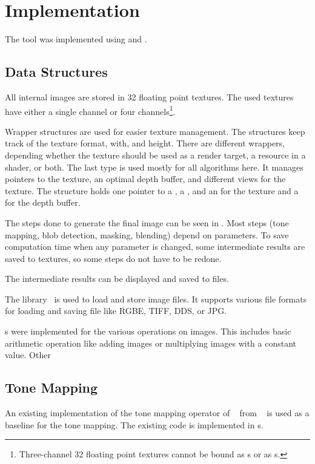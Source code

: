 \section{Implementation}
The tool was implemented using \Cpp{} and \DirectX{}.

\subsection{Data Structures} %
All internal images are stored in \SI{32}{\bit} floating point textures.
The used textures have either a single channel or four channels\footnote{Three-channel \SI{32}{\bit} floating point textures cannot be bound as s or as s.}.

Wrapper structures are used for easier texture management.
The structures keep track of the texture format, with, and height.
There are different wrappers, depending whether the texture should be used as a render target, a resource in a shader, or both.
The last type is used mostly for all algorithms here.
It manages pointers to the texture, an optimal depth buffer, and different views for the texture.
The structure holds one pointer to a , a , and an  for the texture and a  for the depth buffer.

The steps done to generate the final image can be seen in .
Most steps (tone mapping, blob detection, masking, blending) depend on parameters.
To save computation time when any parameter is changed, some intermediate results are saved to textures, so some steps do not have to be redone.

The intermediate results can be displayed and saved to files.

The  library~\cite{DirectXTex} is used to load and store image files.
It supports various file formats for loading and saving file like RGBE, TIFF, DDS, or JPG.



\Computeshader{}s were implemented for the various operations on images.
This includes basic arithmetic operation like adding images or multiplying images with a constant value.
Other 



\subsection{Tone Mapping}
An existing implementation of the tone mapping operator of \citeauthor{Mantiuk2006}~\cite{Mantiuk2006} from ~\cite{Pfstools} is used as a baseline for the tone mapping.
The existing \Cpp{} code is implemented in \DirectX{} \computeshader{}s.


